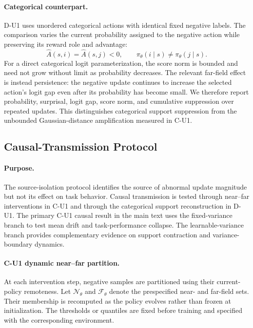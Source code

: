 \documentclass{article}
\theoremstyle{plain}
\theoremstyle{definition}
\theoremstyle{remark}
\begin{document}
\paragraph{Categorical counterpart.}
D-U1 uses unordered categorical actions with identical fixed negative
labels. The comparison varies the current probability assigned to the
negative action while preserving its reward role and advantage:
\begin{equation}
    \widehat A(s,i)
    =
    \widehat A(s,j)
    <0,
    \qquad
    \pi_\theta(i\mid s)
    \neq
    \pi_\theta(j\mid s).
    \label{eq:categorical_source_match}
\end{equation}
For a direct categorical logit parameterization, the score norm is
bounded and need not grow without limit as probability decreases.
The relevant far-field effect is instead persistence: the negative
update continues to increase the selected action's logit gap even after
its probability has become small. We therefore report probability,
surprisal, logit gap, score norm, and cumulative suppression over
repeated updates. This distinguishes categorical support suppression
from the unbounded Gaussian-distance amplification measured in C-U1.


\subsection{Causal-Transmission Protocol}
\label{app:causal_transmission_protocol}

\paragraph{Purpose.}
The source-isolation protocol identifies the source of abnormal update
magnitude but not its effect on task behavior. Causal transmission is tested
through near--far interventions in C-U1 and through the categorical support
reconstruction in D-U1. The primary C-U1 causal result in the main text uses
the fixed-variance branch to test mean drift and task-performance collapse.
The learnable-variance branch provides complementary evidence on support
contraction and variance-boundary dynamics.

\paragraph{C-U1 dynamic near--far partition.}
At each intervention step, negative samples are partitioned using their
current-policy remoteness. Let
$\mathcal N_\theta$
and
$\mathcal F_\theta$
denote the prespecified near- and far-field sets. Their membership is
recomputed as the policy evolves rather than frozen at initialization.
The thresholds or quantiles are fixed before training and specified with the
corresponding environment.
\end{document}
